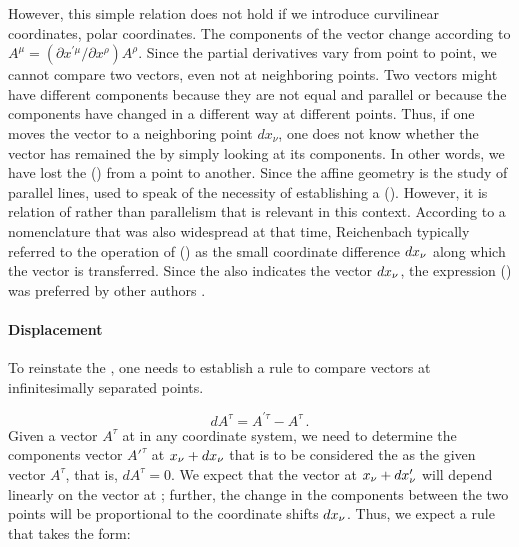 \documentclass[submitted]{article}
\renewcommand{\diff}{d}
\begin{document}
However, this simple relation does not hold if we introduce curvilinear coordinates, \eg polar coordinates. The components of the vector change according to $A^{\mu}=\left(\partial x^{\prime \mu} / \partial x^{\rho}\right) A^{\rho}$. Since the partial derivatives vary from point to point, we cannot compare two vectors, even not at neighboring points. Two vectors might have different components because they are not equal and parallel or because the components have changed in a different way at different points. Thus, if one moves the vector to a neighboring point $dx_\nu$, one does not know whether the vector has remained the  by simply looking at its components. In other words, we have lost the  () from a point to another. Since the affine geometry is the study of parallel lines, \citet{Weyl1918a,Weyl1918b} used to speak of the necessity of establishing a  (). However, it is relation of  rather than parallelism that is relevant in this context. According to a nomenclature that was also widespread at that time, Reichenbach typically referred to the operation of  () as the small coordinate difference $dx_{\nu}$ along which the vector is transferred. Since the  also indicates the vector $dx_{\nu}$, the expression  () was preferred by other authors .

\paragraph{Displacement}
%
To reinstate the , one needs to establish a rule to compare vectors at infinitesimally separated points. 

\begin{equation*}
dA^\tau = A^{\prime\tau}-A^{\tau}\,.
\end{equation*}
%
Given a vector $A^\tau$ at \xn in any coordinate system, we need to determine the components vector $A'^\tau$ at $x_{\nu}+dx_{\nu}$ that is to be considered the  as the given vector $A^\tau$, that is, $dA^\tau=0$. We expect that the vector at $\xn+\diff \xnpr$ will depend linearly on the vector at \xn; further, the change in the components between the two points will be proportional to the coordinate shifts $\diff \xn$. Thus, we expect a rule that takes the form:
\end{document}
